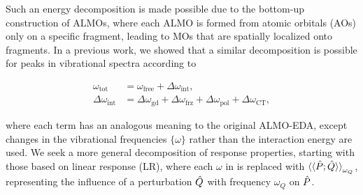 Such an energy decomposition is made possible due to the bottom-up construction of ALMOs, where each ALMO is formed from atomic orbitals (AOs) only on a specific fragment, leading to MOs that are spatially localized onto fragments. In a previous work\cite{Brinzer_2015_212425}, we showed that a similar decomposition is possible for peaks in vibrational spectra according to

\begin{equation}
  \begin{aligned}
    \label{eq:almo-frequencies}
    \omega_{\text{tot}} &= \omega_{\text{free}} + \Delta \omega_{\text{int}}, \\
    \Delta \omega_{\text{int}} &= \Delta \omega_{\text{gd}} + \Delta \omega_{\text{frz}} + \Delta \omega_{\text{pol}} + \Delta \omega_{\text{CT}},
  \end{aligned}
\end{equation}

where each term has an analogous meaning to the original ALMO-EDA, except changes in the vibrational frequencies \(\{\omega\}\) rather than the interaction energy are used. We seek a more general decomposition of response properties, starting with those based on linear response (LR), where each \(\omega\) in  is replaced with \(\braket{\braket{\hat{P}; \hat{Q}}}_{\omega_{Q}}\), representing the influence of a perturbation \(\hat{Q}\) with frequency \(\omega_{Q}\) on \(\hat{P}\).

